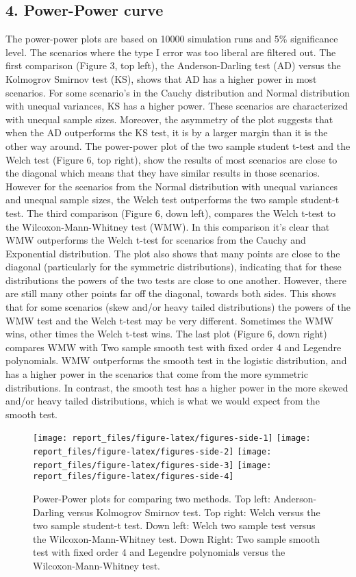 \documentclass[
]{article}
\begin{document}
\hypertarget{power-power-curve}{%
\subsection{4. Power-Power curve}\label{power-power-curve}}

The power-power plots are based on 10000 simulation runs and 5\%
significance level. The scenarios where the type I error was too liberal
are filtered out. The first comparison (Figure 3, top left), the
Anderson-Darling test (AD) versus the Kolmogrov Smirnov test (KS), shows
that AD has a higher power in most scenarios. For some scenario's in the
Cauchy distribution and Normal distribution with unequal variances, KS
has a higher power. These scenarios are characterized with unequal
sample sizes. Moreover, the asymmetry of the plot suggests that when the
AD outperforms the KS test, it is by a larger margin than it is the
other way around. The power-power plot of the two sample student t-test
and the Welch test (Figure 6, top right), show the results of most
scenarios are close to the diagonal which means that they have similar
results in those scenarios. However for the scenarios from the Normal
distribution with unequal variances and unequal sample sizes, the Welch
test outperforms the two sample student-t test. The third comparison
(Figure 6, down left), compares the Welch t-test to the
Wilcoxon-Mann-Whitney test (WMW). In this comparison it's clear that WMW
outperforms the Welch t-test for scenarios from the Cauchy and
Exponential distribution. The plot also shows that many points are close
to the diagonal (particularly for the symmetric distributions),
indicating that for these distributions the powers of the two tests are
close to one another. However, there are still many other points far off
the diagonal, towards both sides. This shows that for some scenarios
(skew and/or heavy tailed distributions) the powers of the WMW test and
the Welch t-test may be very different. Sometimes the WMW wins, other
times the Welch t-test wins. The last plot (Figure 6, down right)
compares WMW with Two sample smooth test with fixed order 4 and Legendre
polynomials. WMW outperforms the smooth test in the logistic
distribution, and has a higher power in the scenarios that come from the
more symmetric distributions. In contrast, the smooth test has a higher
power in the more skewed and/or heavy tailed distributions, which is
what we would expect from the smooth test.

\begin{figure}[H]
\texttt{[image: report\_files/figure-latex/figures-side-1]} \texttt{[image: report\_files/figure-latex/figures-side-2]} \texttt{[image: report\_files/figure-latex/figures-side-3]} \texttt{[image: report\_files/figure-latex/figures-side-4]} \caption{Power-Power plots for comparing two methods. Top left: Anderson-Darling versus Kolmogrov Smirnov test. Top right: Welch versus the two sample student-t test. Down left: Welch two sample test versus the Wilcoxon-Mann-Whitney test. Down Right: Two sample smooth test with fixed order 4 and Legendre polynomials versus the Wilcoxon-Mann-Whitney test.}\label{fig:figures-side}
\end{figure}
\end{document}
